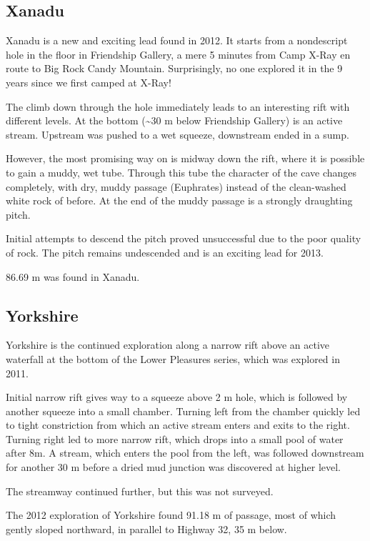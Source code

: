 \hypertarget{xanadu}{%
\subsection{Xanadu}\label{xanadu}}

Xanadu is a new and exciting lead found in 2012. It starts from a
nondescript hole in the floor in Friendship Gallery, a mere 5 minutes
from Camp X-Ray en route to Big Rock Candy Mountain. Surprisingly, no
one explored it in the 9 years since we first camped at X-Ray!

The climb down through the hole immediately leads to an interesting rift
with different levels. At the bottom (\textasciitilde{}30 m below
Friendship Gallery) is an active stream. Upstream was pushed to a wet
squeeze, downstream ended in a sump.

However, the most promising way on is midway down the rift, where it is
possible to gain a muddy, wet tube. Through this tube the character of
the cave changes completely, with dry, muddy passage (Euphrates) instead
of the clean-washed white rock of before. At the end of the muddy
passage is a strongly draughting pitch.

Initial attempts to descend the pitch proved unsuccessful due to the
poor quality of rock. The pitch remains undescended and is an exciting
lead for 2013.

86.69 m was found in Xanadu.

\hypertarget{yorkshire}{%
\subsection{Yorkshire}\label{yorkshire}}

Yorkshire is the continued exploration along a narrow rift above an
active waterfall at the bottom of the Lower Pleasures series, which was
explored in 2011.

Initial narrow rift gives way to a squeeze above 2 m hole, which is
followed by another squeeze into a small chamber. Turning left from the
chamber quickly led to tight constriction from which an active stream
enters and exits to the right. Turning right led to more narrow rift,
which drops into a small pool of water after 8m. A stream, which enters
the pool from the left, was followed downstream for another 30 m before
a dried mud junction was discovered at higher level.

The streamway continued further, but this was not surveyed.

The 2012 exploration of Yorkshire found 91.18 m of passage, most of
which gently sloped northward, in parallel to Highway 32, 35 m below.

